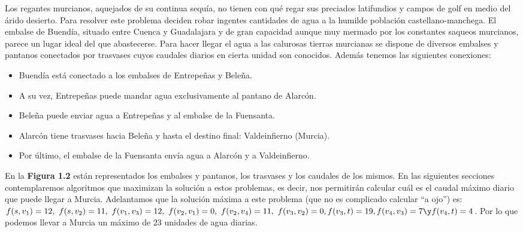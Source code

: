 \begin{ejem} Los regantes murcianos, aquejados de su continua sequía, no tienen con qué regar sus preciados latifundios y campos de golf en medio del árido desierto. Para resolver este problema deciden robar ingentes cantidades de agua a la humilde población castellano-manchega. El embalse de Buendía, situado entre Cuenca y Guadalajara y de gran capacidad aunque muy mermado por los constantes saqueos murcianos, parece un lugar ideal del que abastecerse. Para hacer llegar el agua a las calurosas tierras murcianas se dispone de diversos embalses y pantanos conectados por trasvases cuyos caudales diarios en cierta unidad son conocidos. Además tenemos las siguientes conexiones:
\begin{itemize}
\item Buendía está conectado a los embalses de Entrepeñas y Beleña.
\item A su vez, Entrepeñas puede mandar agua exclusivamente al pantano de Alarcón.
\item Beleña puede enviar agua a Entrepeñas y al embalse de la Fuensanta.
\item Alarcón tiene trasvases hacia Beleña y hasta el destino final: Valdeinfierno (Murcia).
\item Por último, el embalse de la Fuensanta envía agua a Alarcón y a Valdeinfierno.
\end{itemize}
En la \textbf{Figura 1.2} están representados los embalses y pantanos, los trasvases y los caudales de los mismos. En las siguientes secciones contemplaremos algoritmos que maximizan la solución a estos problemas, es decir, nos permitirán calcular cuál es el caudal máximo diario que puede llegar a Murcia. Adelantamos que la solución máxima a este problema (que no es complicado calcular ``a ojo'') es:\\
$f(s,v_1)=12,\ f(s,v_2) = 11,\ f(v_1, v_3) = 12,\ f(v_2,v_1) = 0,\ f(v_2,v_4) = 11,\ f(v_3,v_2)=0,\\
f(v_3,t)=19,f(v_4,v_3)=7\y f(v_4,t)=4$. Por lo que podemos llevar a Murcia un máximo de 23 unidades de agua diarias.
\begin{figura}\ \begin{center}\end{center}\end{figura}
\end{ejem}